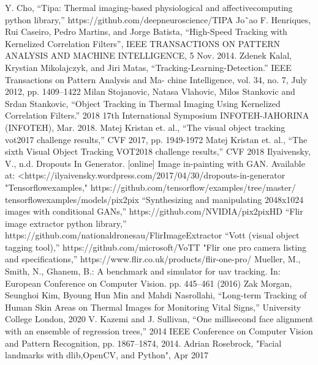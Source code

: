 \documentclass[conference]{IEEEtran}
\begin{document}
\begin{thebibliography}{00}
 Y. Cho, “Tipa: Thermal imaging-based physiological and affectivecomputing python library,” https://github.com/deepneuroscience/TIPA
Jo˜ao F. Henriques, Rui Caseiro, Pedro Martins, and Jorge Batista, “High-Speed Tracking with Kernelized Correlation Filters”, IEEE TRANSACTIONS ON PATTERN ANALYSIS AND MACHINE INTELLIGENCE, 5 Nov. 2014.
Zdenek Kalal, Krystian Mikolajczyk, and Jiri Matas, “Tracking-Learning-Detection.” IEEE Transactions on Pattern Analysis and Ma- chine Intelligence, vol. 34, no. 7, July 2012, pp. 1409–1422
Milan Stojanovic, Natasa Vlahovic, Milos Stankovic and Srdan Stankovic, “Object Tracking in Thermal Imaging Using Kernelized Correlation Filters.” 2018 17th International Symposium INFOTEH-JAHORINA (INFOTEH), Mar. 2018.
Matej Kristan et. al., “The visual object tracking vot2017 challenge results,” CVF 2017, pp. 1949-1972
Matej Kristan et. al., “The sixth Visual Object Tracking VOT2018 challenge results,” CVF 2018
Ilyaivensky, V., n.d. Dropouts In Generator. [online] Image in-painting with GAN. Available at: <https://ilyaivensky.wordpress.com/2017/04/30/dropouts-in-generator
"Tensorflow\textunderscore examples," https://github.com/tensorflow/examples/tree/master/\\tensorflow\textunderscore examples/models/pix2pix
“Synthesizing and manipulating 2048x1024 images with conditional GANs,” https://github.com/NVIDIA/pix2pixHD
“Flir image extractor python library,” https://github.com/nationaldronesau/FlirImageExtractor
“Vott (visual object tagging tool),” https://github.com/microsoft/VoTT
"Flir one pro camera listing and specifications,” https://www.flir.co.uk/products/flir-one-pro/
Mueller, M., Smith, N., Ghanem, B.: A benchmark and simulator for uav tracking. In: European Conference on Computer Vision. pp. 445–461 (2016)
Zak Morgan, Seunghoi Kim, Byoung Hun Min and Mahdi Nasrollahi, “Long-term Tracking of Human Skin Areas on Thermal Images for Monitoring Vital Signs,” University College London, 2020
V. Kazemi and J. Sullivan, “One millisecond face alignment with an ensemble of regression trees,” 2014 IEEE Conference on Computer Vision and Pattern Recognition, pp. 1867–1874, 2014.
Adrian Rosebrock, "Facial landmarks with dlib,OpenCV, and Python", Apr 2017
\end{thebibliography}
\end{document}
